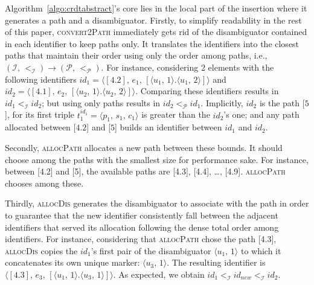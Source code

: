 \noindent Algorithm~\ref{algo:crdtabstract}'s core lies in the local part of the
insertion where it generates a path and a disambiguator. Firstly, to simplify
readability in the rest of this paper, \textsc{convert2Path} immediately gets
rid of the disambiguator contained in each identifier to keep paths only.
It translates the identifiers into the closest paths that maintain their order
using only the order among paths, i.e.,
$(\mathcal{I},\, <_\mathcal{I}) \rightarrow (\mathcal{P},\, <_{\mathcal{P}})$.
For instance, considering 2 elements with the following identifiers
$id_1 = \langle [4.2],\, e_1, \, [\langle u_1,\,1 \rangle.\langle u_1,\,2
\rangle] \rangle$
and
$id_2 = \langle [4.1],\, e_2, \, [\langle u_2,\,1 \rangle.\langle u_2,\,2
\rangle] \rangle$.
Comparing these identifiers results in $id_1<_\mathcal{I} id_2$; but using only
paths results in $id_2 <_\mathcal{P} id_1$. Implicitly, $id_2$ is the path
[$5$], for its first triple $t_1^{id_1} = \langle p_1,\, s_1,\, c_1 \rangle$ is
greater than the $id_2$'s one; and any path allocated between [$4.2$] and [$5$]
builds an identifier between $id_1$ and $id_2$.



\noindent Secondly, \textsc{allocPath} allocates a new path between these
bounds. It should choose among the paths with the smallest size for performance
sake. For instance, between [4.2] and [5], the available paths are [4.3], [4.4],
\ldots, [4.9]. \textsc{allocPath} chooses among these.


\noindent Thirdly, \textsc{allocDis} generates the disambiguator to associate
with the path in order to guarantee that the new identifier consistently fall
between the adjacent identifiers that served its allocation following the dense
total order among identifiers. For instance, considering that \textsc{allocPath}
chose the path [4.3], \textsc{allocDis} copies the $id_1$'s first pair of the
disambiguator $\langle u_1,\,1 \rangle$ to which it concatenates its own unique
marker: $\langle u_3,\,1 \rangle$. The resulting identifier is
$\langle [4.3],\, e_3, \, [\langle u_1,\,1 \rangle .\langle u_3,\, 1\rangle ]
\rangle$.
As expected, we obtain $id_1 <_\mathcal{I} id_{new} <_\mathcal{I} id_2$.  

